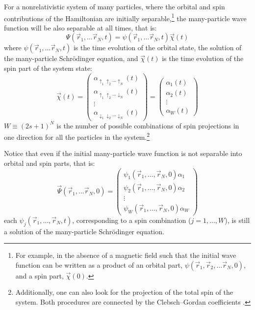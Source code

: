 \documentclass[onecolumn,nofootinbib, secnumarabic, amsmath, nobibnotes,12pt,aps,pra]{revtex4-1}
\begin{document}
For a nonrelativistic system of many particles, where the orbital
and spin contributions of the Hamiltonian are initially separable,\footnote{For
example, in the absence of a magnetic field such that  the initial wave
function can be written as a product of an orbital part, $\psi(\vec
r_1,\vec r_2,\ldots\vec r_N,0)$, and a spin part, $\vec \chi(0)$.}
the many-particle wave function will be also separable at all times,
that is:
\begin{equation}
\label{om.spinND}
\Psi(\vec r_1,\ldots\vec r_N,t) = \psi(\vec r_1,\ldots\vec r_N,t) \vec \chi(t)
\end{equation}
where $\psi(\vec r_1,\ldots\vec r_N,t)$ is the time evolution of the orbital state, the solution of the many-particle Schr\"odinger equation, and $\vec \chi(t)$ is the time evolution of the spin part of the system state:
\begin{equation}
\vec \chi(t) = \left(
\begin{array}{c}
\alpha_{\uparrow_1 \uparrow_2\ldots\uparrow_N}(t) \\ \alpha_{\uparrow_1 \uparrow_2\ldots\downarrow_N}(t) \\ \vdots \\ \alpha_{\downarrow_1 \downarrow_2\ldots\downarrow_N}(t)
\end{array}
\right) = \left(
\begin{array}{c}
\alpha_{1}(t) \\ \alpha_{2}(t) \\ \vdots \\ \alpha_{W}(t)
\end{array}
\right)
\end{equation}
$W \equiv (2s + 1)^N$ is the number of possible combinations of spin
projections in one direction for all the particles in the
system.\footnote{Additionally, one can also
look for the projection of the total spin of the system. Both
procedures are connected by the Clebsch--Gordan coefficients
\cite{om.landaulif}.}

Notice that even if the initial many-particle wave function is not separable into orbital and spin parts, that is:
\begin{equation}
\label{om.spinNDmany}
\vec \Psi(\vec r_1,\ldots\vec r_N,0) = \left(
\begin{array}{c}
\psi_{1}(\vec r_1,\ldots,\vec r_N,0) \alpha_1 \\ \psi_{2}(\vec r_1,\ldots,\vec r_N,0) \alpha_2 \\ \vdots \\ \psi_{W}(\vec r_1,\ldots,\vec r_N,0) \alpha_W
\end{array}
\right)
\end{equation}
each $\psi_{j}(\vec r_1,\ldots,\vec r_N,t)$, corresponding to a spin combination ($j = 1, \ldots, W$), is still a solution of the many-particle Schr\"odinger equation.
\end{document}
